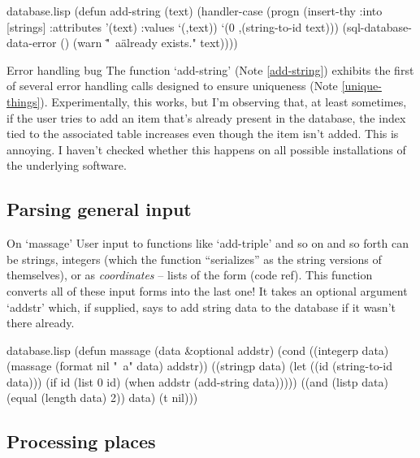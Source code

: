 \begin{common}{database.lisp}
(defun add-string (text)
  (handler-case
   (progn (insert-thy :into [strings]
                      :attributes '(text)
                      :values `(,text))
          `(0 ,(string-to-id text)))
   (sql-database-data-error ()
     (warn "\"~a\" already exists."
           text))))
\end{common}

\begin{notate}{Error handling bug}
The function `add-string' (Note \ref{add-string}) exhibits
the first of several error handling calls designed to
ensure uniqueness (Note \ref{unique-things}).
Experimentally, this works, but I'm observing that, at
least sometimes, if the user tries to add an item that's
already present in the database, the index tied to the
associated table increases even though the item isn't
added.  This is annoying.  I haven't checked whether this
happens on all possible installations of the underlying
software.
\end{notate}

\subsection*{Parsing general input}

\begin{notate}{On `massage'} \label{massage}
User input to functions like `add-triple' and so on and so
forth can be strings, integers (which the function
``serializes'' as the string versions of themselves), or
as \emph{coordinates} -- lists of the form (code ref).
This function converts all of these input forms into the
last one!  It takes an optional argument `addstr' which,
if supplied, says to add string data to the database if it
wasn't there already.
\end{notate}

\begin{common}{database.lisp}
(defun massage (data &optional addstr)
  (cond
   ((integerp data)
    (massage (format nil "~a" data) addstr))
   ((stringp data)
    (let ((id (string-to-id data)))
      (if id
          (list 0 id)
          (when addstr
            (add-string data)))))
   ((and (listp data)
         (equal (length data) 2))
    data)
   (t nil)))
\end{common}

\subsection*{Processing places}


